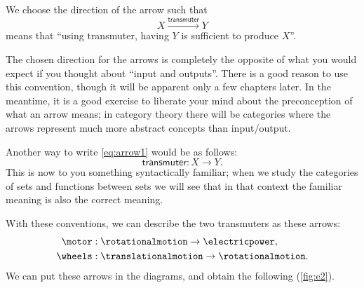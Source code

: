We choose the direction of the arrow such that
\begin{equation}
\label{eq:arrow1}
    X \stackrel{\textsf{transmuter}}{\longrightarrow} Y 
\end{equation}
means that ``using \textsf{transmuter}, having $Y$ is sufficient to produce $X$''. 

\begin{remark}
The chosen direction
for the arrows is completely the opposite of what you would expect if you thought about
``input and outputs''. There is a good reason to use this convention, though it will
be apparent only a few chapters later. In the meantime, it is a good exercise
to liberate your mind about the preconception of what an arrow means; in category theory
there will be categories where the arrows represent much more abstract concepts than input/output.
\end{remark}

Another way to write \ref{eq:arrow1} would be as follows:
\begin{equation}
    \textsf{transmuter}\colon X \to Y.
\end{equation}
This is now to you something syntactically familiar; when we study the categories of sets and functions between sets we will see that in that context the familiar meaning is also the correct meaning.

With these conventions, we can describe the two transmuters as these arrows:
% 
\begin{align}
    \motor&:  \rotationalmotion \rightarrow \electricpower, \\
    \wheels&: \translationalmotion \rightarrow \rotationalmotion.
\end{align}
% 
We can put these arrows in the diagrams, and obtain 
the following (\cref{fig:e2}).





